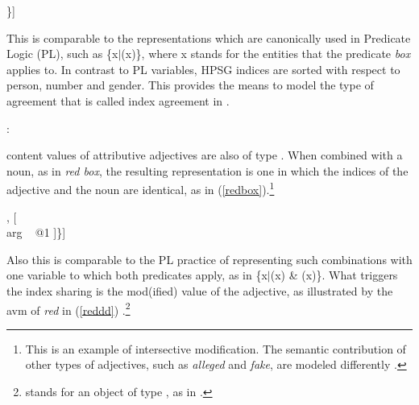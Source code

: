 \documentclass[output=paper]{langsci/langscibook}
\begin{document}
\begin{exe} 
\ex\label{red} 
\begin{avm}
[\type{scope-obj}        \\
 index ~ @1 \type{index} \\
 restr ~ \{[\type{box}   \\
            arg ~ @1 ]\}]
\end{avm} 
\end{exe}

\noindent
This is comparable to the representations which are canonically used in 
Predicate Logic (PL), such as \{x$|$(x)\}, where x stands for 
the entities that the predicate \emph{box} applies to. In contrast to 
PL variables, HPSG indices are sorted with respect to person, number 
and gender. This provides the means to model the type of agreement that 
is called index agreement in .

\begin{exe} 
\ex  {}: \begin{avm}
                     \end{avm} 
\end{exe} 

{\sc content} values of attributive adjectives are also of type . 
When combined with a noun, as in \emph{red box}, the resulting representation 
is one in which the indices of the adjective and the noun are identical, as in 
(\ref{redbox}).\footnote{This is an example of intersective modification. 
The semantic contribution of other types of adjectives, such as  
\emph{alleged} and \emph{fake}, are modeled differently \citep[330--331]{ps2}.}   

\begin{exe} 
\ex\label{redbox} 
\begin{avm}
[\type{scope-obj}         \\
 index ~ @1                \\
 restr ~ \{ [\type{red}   \\
             arg ~ @1 ] ,
            [   \\
             arg ~ @1 ]\}]
\end{avm}
\end{exe}

\noindent
Also this is comparable to the PL practice of representing such 
combinations with one variable to which both predicates apply, as in 
\{x$|$(x) \& (x)\}. What triggers the index sharing is 
the {\sc mod(ified)} value of the adjective, as illustrated by the {\sc avm} of 
\emph{red} in (\ref{reddd}) \citep[55]{ps2}.\footnote{\avmbox{$\Sigma$} 
stands for an object of type , as in \citet{GS00}.} 
\end{document}
